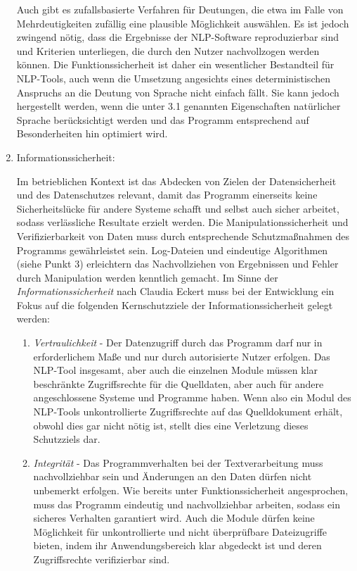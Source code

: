 \documentclass[12pt]{report}
\begin{document}
\begin{enumerate}
Auch gibt es zufallsbasierte Verfahren für Deutungen, die etwa im Falle von Mehrdeutigkeiten zufällig eine plausible Möglichkeit auswählen. Es ist jedoch zwingend nötig, dass die Ergebnisse der NLP-Software reproduzierbar sind und Kriterien unterliegen, die durch den Nutzer nachvollzogen werden können. Die Funktionssicherheit ist daher ein wesentlicher Bestandteil für NLP-Tools, auch wenn die Umsetzung angesichts eines deterministischen Anspruchs an die Deutung von Sprache nicht einfach fällt. Sie kann jedoch hergestellt werden, wenn die unter 3.1 genannten Eigenschaften natürlicher Sprache berücksichtigt werden und das Programm entsprechend auf Besonderheiten hin optimiert wird.

\item Informationssicherheit:

Im betrieblichen Kontext ist das Abdecken von Zielen der Datensicherheit und des Datenschutzes relevant, damit das Programm einerseits keine Sicherheitslücke für andere Systeme schafft und selbst auch sicher arbeitet, sodass verlässliche Resultate erzielt werden. Die Manipulationssicherheit und Verifizierbarkeit von Daten muss durch entsprechende Schutzmaßnahmen des Programms gewährleistet sein. Log-Dateien und eindeutige Algorithmen (siehe Punkt 3) erleichtern das Nachvollziehen von Ergebnissen und Fehler durch Manipulation werden kenntlich gemacht. Im Sinne der \textit{Informationssicherheit} nach Claudia Eckert \cite{eck13} muss bei der Entwicklung ein Fokus auf die folgenden Kernschutzziele der Informationssicherheit gelegt werden:
\begin{enumerate}
\item \textit{Vertraulichkeit} - Der Datenzugriff durch das Programm darf nur in erforderlichem Maße und nur durch autorisierte Nutzer erfolgen. Das NLP-Tool insgesamt, aber auch die einzelnen Module müssen klar beschränkte Zugriffsrechte für die Quelldaten, aber auch für andere angeschlossene Systeme und Programme haben. Wenn also ein Modul des NLP-Tools unkontrollierte Zugriffsrechte auf das Quelldokument erhält, obwohl dies gar nicht nötig ist, stellt dies eine Verletzung dieses Schutzziels dar. 
\item \textit{Integrität} - Das Programmverhalten bei der Textverarbeitung muss nachvollziehbar sein und Änderungen an den Daten dürfen nicht unbemerkt erfolgen. Wie bereits unter Funktionssicherheit angesprochen, muss das Programm eindeutig und nachvollziehbar arbeiten, sodass ein sicheres Verhalten garantiert wird. Auch die Module dürfen keine Möglichkeit für unkontrollierte und nicht überprüfbare Dateizugriffe bieten, indem ihr Anwendungsbereich klar abgedeckt ist und deren Zugriffsrechte verifizierbar sind.

\end{enumerate}
\end{enumerate}
\end{document}
